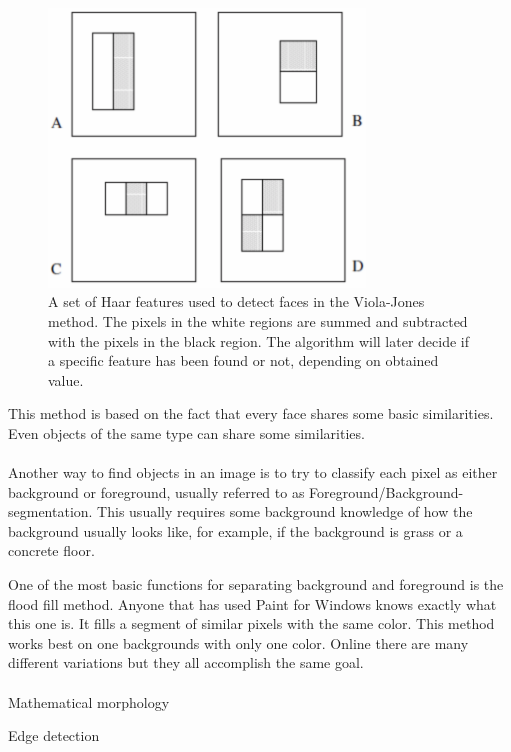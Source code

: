 \begin{figure}[hbtp]
\begin{center}
\includegraphics[width = 0.75\textwidth]{./Images/viola-jones.jpg} 
\caption{A set of Haar features used to detect faces in the Viola-Jones method. The pixels in the white regions are summed and subtracted with the pixels in the black region. The algorithm will later decide if a specific feature has been found or not, depending on obtained value.}
\end{center}
\end{figure}

This method is based on the fact that every face shares some basic similarities. Even objects of the same type can share some similarities.\cite{violaJones}
\\\\
Another way to find objects in an image is to try to classify each pixel as either background or foreground, usually referred to as Foreground/Background-segmentation. This usually requires some background knowledge of how the background usually looks like, for example, if the background is grass or a concrete floor.

One of the most basic functions for separating background and foreground is the flood fill method.
Anyone that has used Paint for Windows knows exactly what this one is. It fills a segment of similar pixels with the same color. This method works best on one backgrounds with only one color.
Online there are many different variations but they all accomplish the same goal.\cite{floodFill}
\\\\
Mathematical morphology

Edge detection

